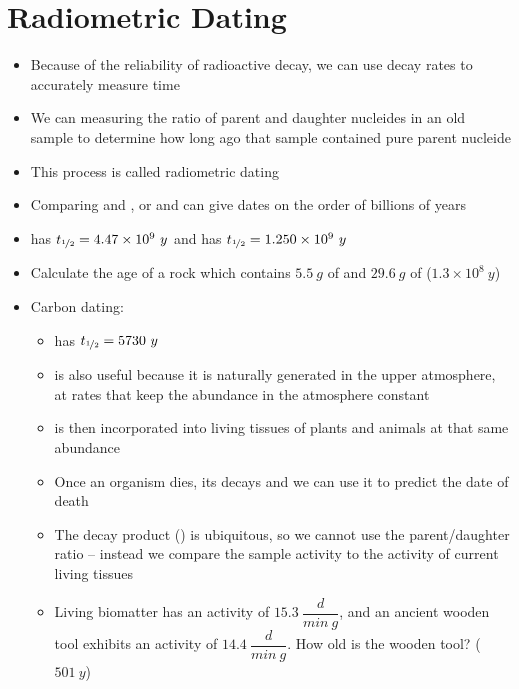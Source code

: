 \documentclass[12pt, openany, letterpaper]{memoir}
\begin{document}
\section{Radiometric Dating}
\begin{itemize}
	\item Because of the reliability of radioactive decay, we can use decay rates to accurately measure time
	\item We can measuring the ratio of parent and daughter nucleides in an old sample to determine how long ago that sample contained pure parent nucleide
	\item This process is called radiometric dating
	\item Comparing  and , or  and  can give dates on the order of billions of years
	\item {} has $t_{\nicefrac{1}{2}}=4.47\times10^9~y$ and  has $t_{\nicefrac{1}{2}}=1.250\times10^9~y$
	\item Calculate the age of a rock which contains $5.5~g$ of  and $29.6~g$ of  ($1.3\times10^8~y$)
	\item Carbon dating:
	\begin{itemize}
		\item {} has $t_{\nicefrac{1}{2}}=5730~y$
		\item {} is also useful because it is naturally generated in the upper atmosphere, at rates that keep the  abundance in the atmosphere constant
		\item {} is then incorporated into living tissues of plants and animals at that same abundance
		\item Once an organism dies, its  decays and we can use it to predict the date of death
		\item The  decay product () is ubiquitous, so we cannot use the parent/daughter ratio -- instead we compare the sample activity to the activity of current living tissues
		\item Living biomatter has an activity of $15.3~\dfrac{d}{min~g}$, and an ancient wooden tool exhibits an activity of $14.4~\dfrac{d}{min~g}$. How old is the wooden tool? ($501~y$)
	\end{itemize} 
\end{itemize}
\end{document}

